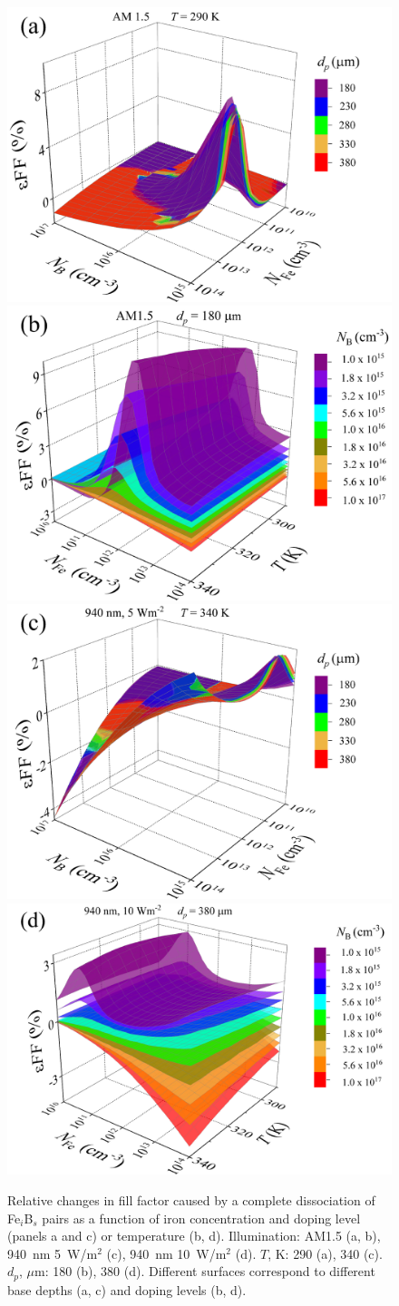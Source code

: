 \documentclass[a4paper,fleqn]{cas-sc}
\begin{document}
\begin{figure}
	\centering
     \includegraphics[width=0.49\linewidth]{Fig8a.png}
     \includegraphics[width=0.49\linewidth]{Fig8b.png}
     \includegraphics[width=0.49\linewidth]{Fig8c.png}
     \includegraphics[width=0.49\linewidth]{Fig8d.png}
	  \caption{Relative changes in fill factor caused by a complete
       dissociation of Fe$_i$B$_s$ pairs as a function of
       iron concentration and
       doping level (panels a and c) or temperature (b, d).
       Illumination: AM1.5 (a, b), 940~nm 5~W/m$^{2}$ (c),  940~nm 10~W/m$^{2}$ (d).
       $T$, K: 290 (a), 340 (c).
       $d_p$, $\mu$m: 180 (b), 380 (d).
       Different surfaces correspond to different base depths (a, c) and doping levels (b, d).
}\label{fig8}
\end{figure}
\end{document}

